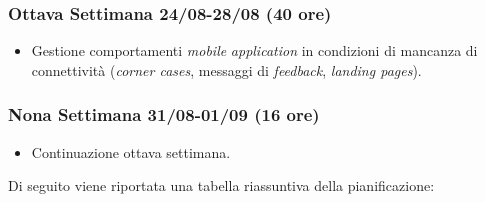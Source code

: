 \begin{trivlist}
\item \subsubsection{Ottava Settimana 24/08-28/08 (40 ore)}
\begin{itemize}
	\item Gestione comportamenti \emph{mobile} \emph{application} in condizioni di mancanza di connettività (\emph{corner cases}, messaggi di \emph{feedback}, \emph{landing pages}).
\end{itemize}

\item \subsubsection{Nona Settimana 31/08-01/09 (16 ore)}
\begin{itemize}
	\item Continuazione ottava settimana.
\end{itemize}
\end{trivlist}\clearpage
Di seguito viene riportata una tabella riassuntiva della pianificazione:

